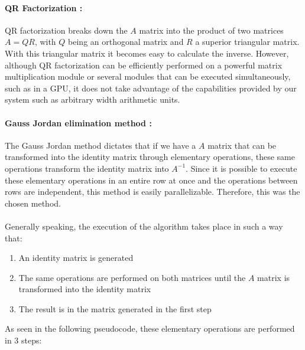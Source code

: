\paragraph{QR Factorization \cite{alberto_oliveira_de_souza_junior_exploration_2020}:}
QR factorization breaks down the $A$ matrix into the product of two matrices $A = QR$, with $Q$ being an orthogonal matrix and $R$ a superior triangular matrix. With this triangular matrix it becomes easy to calculate the inverse. However, although QR factorization can be efficiently performed on a powerful matrix multiplication module or several modules that can be executed simultaneously, such as in a GPU, it does not take advantage of the capabilities provided by our system such as arbitrary width arithmetic units.
\paragraph{Gauss Jordan elimination method \cite{gonzalez_fpga_2016}:}
The Gauss Jordan method dictates that if we have a $A$ matrix that can be transformed into the identity matrix through elementary operations, these same operations transform the identity matrix into $A^{-1}$. Since it is possible to execute these elementary operations in an entire row at once and the operations between rows are independent, this method is easily parallelizable.
Therefore, this was the chosen method.
\\
\\
Generally speaking, the execution of the algorithm takes place in such a way that:
\begin{enumerate}
\item An identity matrix is generated
\item The same operations are performed on both matrices until the $A$ matrix is transformed into the identity matrix
\item The result is in the matrix generated in the first step
\end{enumerate}
\noindent As seen in the following pseudocode, these elementary operations are performed in 3 steps:

